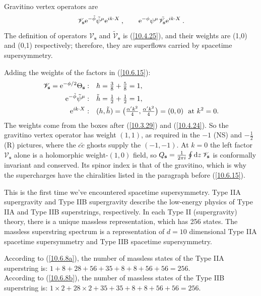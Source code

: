 	Gravitino vertex operators are
	\begin{equation}
		\mathscr{V}_{\mathbf{s}}\mathrm{e}^{-\tilde{\phi}}\tilde{\psi}^{\mu}\mathrm{e}^{i k\cdot X} \:, \qquad
		\mathrm{e}^{-\phi}\psi^{\mu} \tilde{\mathscr{V}}_{\mathbf{s}}\mathrm{e}^{i k\cdot X} \:. \label{10.6.15}
	\end{equation}
	The definition of operators $\mathscr{V}_{\mathbf{s}}$ and $\tilde{\mathscr{V}}_{\mathbf{s}}$ is (\ref{10.4.25}), and their weights are (1,0) and (0,1) respectively; therefore, they are superflows carried by spacetime supersymmetry.
	\begin{tcolorbox}[breakable]
		\begin{remark}
			Adding the weights of the factors in (\ref{10.6.15}):
			\begin{align*}
				\mathscr V_{\mathbf s}=\me^{-\phi/2}\Theta_{\mathbf s}:&\quad h=\tfrac38+\tfrac58=1,\\
				\me^{-\tilde\phi}\tilde\psi^\mu:&\quad \tilde h=\tfrac12+\tfrac12=1,\\
				\me^{\mi k\cdot X}:&\quad (h,\tilde h)=\bigl(\tfrac{\alpha'k^{2}}{4},\tfrac{\alpha'k^{2}}{4}\bigr)=(0,0)\ \text{ at } k^{2}=0 .
			\end{align*}
			The weights come from the boxes after (\ref{10.3.29}) and (\ref{10.4.24}). So the gravitino vertex operator has weight $(1,1)$, as required in the $-1$ (NS) and $-\tfrac12$ (R) pictures, where the $c\tilde c$ ghosts supply the $(-1,-1)$. At $k=0$ the left factor $\mathscr V_{\mathbf s}$ alone is a holomorphic weight-$(1,0)$ field, so $Q_{\mathbf s}=\frac{1}{2\pi i}\oint\mathrm{d} z\,\mathscr V_{\mathbf s}$ is conformally invariant and conserved. Its spinor index is that of the gravitino, which is why the supercharges have the chiralities listed in the paragraph before (\ref{10.6.15}).
		\end{remark}
	\end{tcolorbox}
	
	This is the first time we've encountered spacetime supersymmetry. Type IIA supergravity and Type IIB supergravity describe the low-energy physics of Type IIA and Type IIB superstrings, respectively. In each Type II (supergravity) theory, there is a unique massless representation, which has 256 states. The massless superstring spectrum is a representation of $d=10$ dimensional Type IIA spacetime supersymmetry and Type IIB spacetime supersymmetry.
	\begin{tcolorbox}[breakable]
		According to (\ref{10.6.8a}), the number of massless states of the Type IIA superstring is: $1+8+28+56+35+8+8+56+56=256$.\\
		According to (\ref{10.6.8b}), the number of massless states of the Type IIB superstring is: $1\times2+28\times 2+35+35+8+8+56+56=256$.
	\end{tcolorbox}
	

